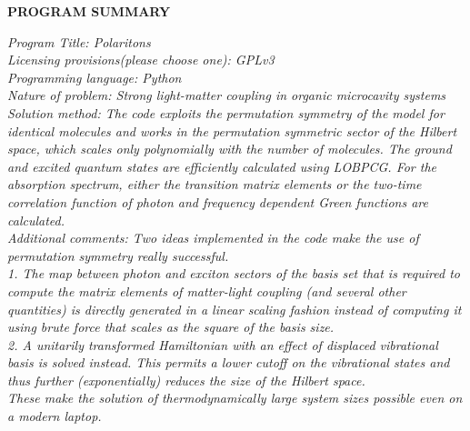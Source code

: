 \documentclass[final,twocolumn]{elsarticle}
\begin{document}
{\bf PROGRAM SUMMARY}

\begin{small}
\noindent
{\em Program Title: Polaritons}                                          \\
{\em Licensing provisions(please choose one): GPLv3}                                   \\
{\em Programming language: Python}                                   \\

{\em Nature of problem: Strong light-matter coupling in organic microcavity systems}\\
{\em Solution method:
  The code exploits the permutation symmetry of the model for identical molecules
  and works in the permutation symmetric sector of the Hilbert space, which scales only polynomially with the number of molecules. 
  The ground and excited quantum states are efficiently calculated using LOBPCG.
 For the absorption spectrum, either the transition matrix elements
or the two-time correlation function of photon and frequency dependent Green functions are calculated.
 }\\
{\em Additional comments:
   Two ideas implemented in the code make the use of permutation symmetry really successful.\\
 1. The map between photon and exciton sectors of the basis set that is required to compute the matrix elements of matter-light coupling (and several other quantities) is directly generated in a linear scaling fashion instead of computing it using brute force that scales as the square of the basis size.\\
  2. A unitarily transformed Hamiltonian with an effect of displaced vibrational basis is solved instead. This permits a lower cutoff on the vibrational states and thus further (exponentially) reduces the size of the Hilbert space.\\
These make the solution of thermodynamically large system sizes possible even on a modern laptop.
    }\\
    

\end{small}
\end{document}
